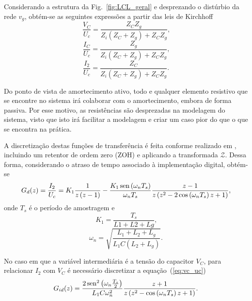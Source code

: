     Considerando a estrutura da Fig.~\ref{fig:LCL_geral} e desprezando o distúrbio da
    rede $v_g$, obtém-se as seguintes expressões a partir das leis de Kirchhoff
    \begin{equation}
        \frac{V_C}{U_c} = \frac{Z_C Z_g}{Z_i \left( Z_C + Z_g \right) + Z_C Z_g}
        \text{,}
        \label{eq:vc_uc}
    \end{equation}
    \begin{equation}
        \frac{I_C}{U_c} = \frac{Z_g}{Z_i \left( Z_C + Z_g \right) + Z_C Z_g}
        \text{,}
        \label{eq:ic_uc}
    \end{equation}
    \begin{equation}
        \frac{I_2}{U_c} = \frac{Z_C}{Z_i \left( Z_C + Z_g \right) + Z_C Z_g}
        \text{.}
    \end{equation}

    Do ponto de vista de amortecimento ativo, todo e qualquer elemento resistivo
    que se encontre no sistema irá colaborar com o amortecimento, embora de forma
    passiva. Por esse motivo, as resistências são desprezadas na modelagem do
    sistema, visto que isto irá facilitar a modelagem e criar um caso pior do que
    o que se encontra na prática.

    A discretização destas funções de transferência é feita conforme realizado
    em \cite{ref:PARKER}, incluindo um retentor de ordem zero (ZOH) e aplicando a
    transformada $\mathcal{Z}$. Dessa forma, considerando o atraso de tempo associado
    à implementação digital, obtém-se
    \begin{equation}
        G_d (z) = \frac{I_2}{U_c} = K_1 \frac{1}{z \left( z-1 \right)}
        - \frac{K_1 \operatorname{sen} \left( \omega_n T_s \right) }{\omega_n T_s}
        \frac{z-1}{z \left( z^2 - 2 \cos\left( \omega_n T_s \right) z +1 \right) }
        \text{,}
    \end{equation}
    onde $T_s$ é o período de amostragem e
    \begin{equation}
        K_1 = \frac{T_s}{L1 + L2 + Lg} \text{,}
    \end{equation}
    \begin{equation}
        \omega_n = \sqrt{\frac{ L_1 + L_2 + L_g }{ L_1 C \left( L_2 + L_g \right)}}
        \text{.}
    \end{equation}

    No caso em que a variável intermediária é a tensão do capacitor $V_C$, para
    relacionar $I_2$ com $V_C$ é necessário discretizar a equação~(\ref{eq:vc_uc})
    \begin{equation}
        G_{id}(z) = \frac{2 \operatorname{sen}^2 \left( \omega_n \frac{T_s}{2} \right)}{L_1 C \omega_n^2}
            \frac{z+1}{z \left( z^2 - \cos \left( \omega_n T_s \right) z + 1 \right)}
            \text{.}
    \end{equation}

